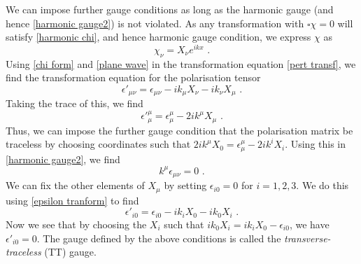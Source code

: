 \documentclass[11pt]{cuthesis}
\newcommand{\mn}{_{\mu\nu}}
\newcommand{\fs}{\text{ .}}
\begin{document}
We can impose further gauge conditions as long as the harmonic gauge (and hence \ref{harmonic gauge2}) is not violated. As any transformation with $\square \chi = 0$ will satisfy \ref{harmonic chi}, and hence harmonic gauge condition, we express $\chi$ as 
\begin{equation} \label{chi form}
\chi_\nu = X_\nu e^{ikx} \fs
\end{equation}
Using \ref{chi form} and \ref{plane wave} in the transformation equation \ref{pert transf}, we find the transformation equation for the polarisation tensor
\begin{equation} \label{epsilon tranform}
\epsilon'\mn = \epsilon\mn -ik_\mu X_\nu - ik_\nu X_\mu \fs
\end{equation}
Taking the trace of this, we find
\begin{equation}
\epsilon'^\mu_\mu = \epsilon^\mu_\mu - 2ik^\mu X_\mu \fs
\end{equation}
Thus, we can impose the further gauge condition that the polarisation matrix be traceless by choosing coordinates such that $2ik^\mu X_0 = \epsilon^\mu_\mu - 2ik^i X_i$. Using this in \ref{harmonic gauge2}, we find
\begin{equation} \label{harmonic gauge 3}
k^\mu \epsilon\mn = 0 \fs
\end{equation}
We can fix the other elements of $X_\mu$ by setting $\epsilon_{i 0} = 0$ for $i=1,2,3$. We do this using \ref{epsilon tranform} to find
\begin{equation} \label{epsilon 0}
\epsilon'_{i 0} = \epsilon_{i 0} -ik_i X_0 - ik_0 X_i \fs
\end{equation}
Now we see that by choosing the $X_i$ such that $ ik_0 X_i = ik_i X_0 - \epsilon_{i 0}$, we have $\epsilon'_{i 0} = 0$. The gauge defined by the above conditions is called the \textit{transverse-traceless} (TT) gauge.

\end{document}
